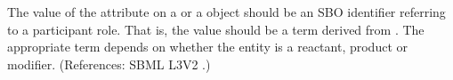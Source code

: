 The value of the attribute  on a \SpeciesReference or a
\ModifierSpeciesReference object should be an SBO identifier referring to a
participant role.  That is, the value should be a term derived from
\sboparticipantrole.  The appropriate term depends on whether the entity is
a reactant, product or modifier.  (References: SBML L3V2
.)
